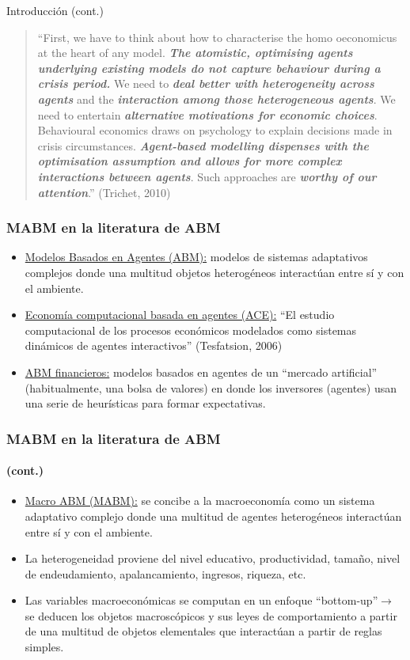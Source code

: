 \documentclass[11pt]{beamer}
\begin{document}
\begin{frame}{Introducción (cont.)}
\begin{quote}
    \small ``First, we have to think about how to characterise the homo
oeconomicus at the heart of any model. \textit{\textbf{The atomistic, optimising agents underlying existing models do not capture behaviour during a crisis period.}} We need to \textit{\textbf{deal better with heterogeneity across agents}} and the \textit{\textbf{interaction among those heterogeneous agents}}. We need to entertain \textit{\textbf{alternative motivations for economic choices}}. Behavioural economics draws on psychology to explain decisions made in crisis circumstances. \textit{\textbf{Agent-based modelling dispenses with the optimisation assumption and allows for more complex interactions between agents}}. Such approaches are \textit{\textbf{worthy of our attention}}.'' (Trichet, 2010)
\end{quote}    
\end{frame}

\begin{frame}
	\frametitle{MABM en la literatura de ABM} 
	\begin{itemize}
		\item \underline{Modelos Basados en Agentes (ABM):} modelos de sistemas adaptativos complejos donde una multitud objetos heterogéneos interactúan entre sí y con el ambiente.
		\item  \underline{Economía computacional basada en agentes (ACE):} ``El estudio computacional de los procesos económicos modelados como sistemas dinámicos de agentes interactivos'' (Tesfatsion, 2006)
		\item  \underline{ABM financieros:} modelos basados en agentes de un ``mercado artificial'' (habitualmente, una bolsa de valores) en donde los inversores (agentes) usan una serie de heurísticas para formar expectativas.
	\end{itemize}
\end{frame}

\begin{frame}
	\frametitle{MABM en la literatura de ABM} 
	\framesubtitle{(cont.)}
	\begin{itemize}
		\item \underline{Macro ABM (MABM):} se concibe a la macroeconomía como un sistema adaptativo complejo donde una multitud de agentes heterogéneos interactúan entre sí y con el ambiente.
		\item La heterogeneidad proviene del nivel educativo, productividad, tamaño, nivel de endeudamiento, apalancamiento, ingresos, riqueza, etc.
		\item Las variables macroeconómicas se computan en un enfoque ``bottom-up''$\rightarrow$ se deducen los objetos macroscópicos y sus leyes de comportamiento a partir de una multitud de objetos elementales que interactúan a partir de reglas simples.
	\end{itemize}
\end{frame}
\end{document}
